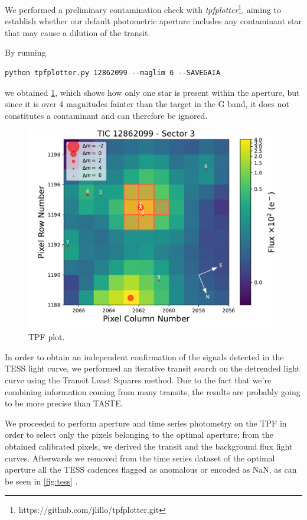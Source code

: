 \documentclass[a4paper,11pt,twocolumn]{article}
\begin{document}
We performed a preliminary contamination check with \textit{tpfplotter}\footnote{https://github.com/jlillo/tpfplotter.git}, 
aiming to establish whether our default photometric aperture includes any contaminant star that may cause a dilution of the transit.

By running
\begin{lstlisting}
python tpfplotter.py 12862099 --maglim 6 --SAVEGAIA
\end{lstlisting}
we obtained \ref{fig:tpfplot}, which shows how only one star is present within the aperture, 
but since it is over 4 magnitudes fainter than the target in the G band, it does not constitutes a contaminant and can therefore be ignored.
\begin{figure}
    \centering
    \includegraphics[scale=0.4, angle=0]{../pictures/tess/TPF.pdf}
    \caption{TPF plot.}
    \label{fig:tpfplot}
\end{figure}


In order to obtain an independent confirmation of the signals
detected in the TESS light curve, we performed an iterative transit
search on the detrended light curve using the Transit Least Squares method.
Due to the fact that we're combining information coming from many transits, 
the results are probably going to be more precise than TASTE.



We proceeded to perform aperture and time series photometry on the TPF in order to select only the 
pixels belonging to the optimal aperture; from the obtained calibrated pixels, we derived 
the transit and the background flux light curves. Afterwards we removed from the time series 
dataset of the optimal aperture all the TESS cadences flagged as anomalous or encoded as NaN, 
as can be seen in \ref{fig:tess} .
\end{document}
